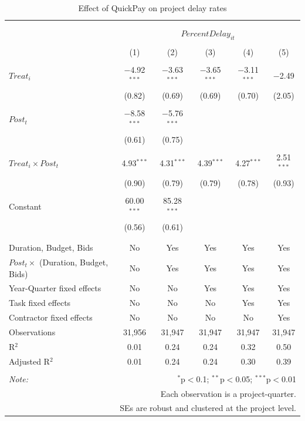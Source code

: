 \documentclass[
]{article}
\begin{document}
\begin{table}[H] \centering 
  \caption{Effect of QuickPay on project delay rates} 
  \label{} 
\small 
\begin{tabular}{@{\extracolsep{-2pt}}lccccc} 
\\[-1.8ex]\hline 
\hline \\[-1.8ex] 
\\[-1.8ex] & \multicolumn{5}{c}{$PercentDelay_{it}$} \\ 
\\[-1.8ex] & (1) & (2) & (3) & (4) & (5)\\ 
\hline \\[-1.8ex] 
 $Treat_i$ & $-$4.92$^{***}$ & $-$3.63$^{***}$ & $-$3.65$^{***}$ & $-$3.11$^{***}$ & $-$2.49 \\ 
  & (0.82) & (0.69) & (0.69) & (0.70) & (2.05) \\ 
  & & & & & \\ 
 $Post_t$ & $-$8.58$^{***}$ & $-$5.76$^{***}$ &  &  &  \\ 
  & (0.61) & (0.75) &  &  &  \\ 
  & & & & & \\ 
 $Treat_i \times Post_t$ & 4.93$^{***}$ & 4.31$^{***}$ & 4.39$^{***}$ & 4.27$^{***}$ & 2.51$^{***}$ \\ 
  & (0.90) & (0.79) & (0.79) & (0.78) & (0.93) \\ 
  & & & & & \\ 
 Constant & 60.00$^{***}$ & 85.28$^{***}$ &  &  &  \\ 
  & (0.56) & (0.61) &  &  &  \\ 
  & & & & & \\ 
\hline \\[-1.8ex] 
Duration, Budget, Bids & No & Yes & Yes & Yes & Yes \\ 
$Post_t \times$  (Duration, Budget, Bids) & No & Yes & Yes & Yes & Yes \\ 
Year-Quarter fixed effects & No & No & Yes & Yes & Yes \\ 
Task fixed effects & No & No & No & Yes & Yes \\ 
Contractor fixed effects & No & No & No & No & Yes \\ 
Observations & 31,956 & 31,947 & 31,947 & 31,947 & 31,947 \\ 
R$^{2}$ & 0.01 & 0.24 & 0.24 & 0.32 & 0.50 \\ 
Adjusted R$^{2}$ & 0.01 & 0.24 & 0.24 & 0.30 & 0.39 \\ 
\hline 
\hline \\[-1.8ex] 
\textit{Note:}  & \multicolumn{5}{r}{$^{*}$p$<$0.1; $^{**}$p$<$0.05; $^{***}$p$<$0.01} \\ 
 & \multicolumn{5}{r}{Each observation is a project-quarter.} \\ 
 & \multicolumn{5}{r}{SEs are robust and clustered at the project level.} \\ 
\end{tabular} 
\end{table}
\end{document}

